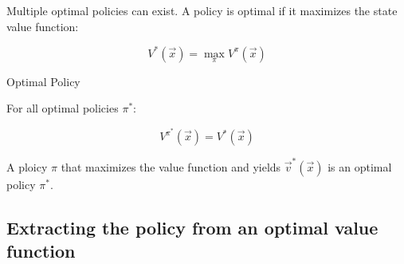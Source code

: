 \begin{frame}\frametitle{\subsecname}

Multiple optimal policies can exist. A policy is optimal if it maximizes the state value function:

\begin{equation}
V^{*}(\vec x) = \max_{\pi} V^{\pi} (\vec x)   
\end{equation}

\begin{block}{Optimal Policy}

For all optimal policies $\pi^{*}$:

\begin{equation}
    V^{\pi^{*}}(\vec x) = V^{*}(\vec x) 
\end{equation}

A ploicy $\pi$ that maximizes the value function and yields $\vec v^{*}(\vec x)$ is an optimal policy $\pi^{*}$.
    
\end{block}

    
\end{frame}

\subsection{Extracting the policy from an optimal value function}

